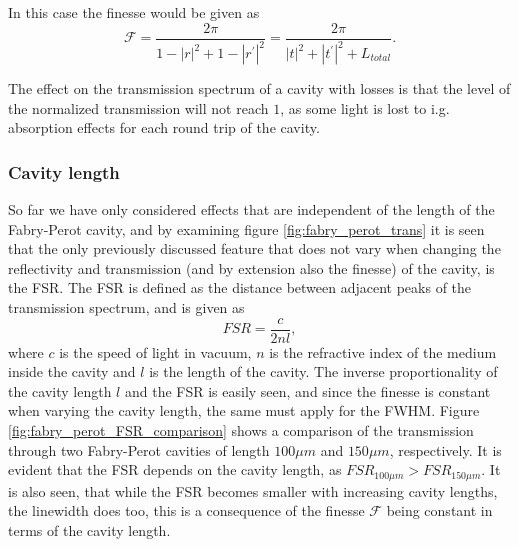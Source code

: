 In this case the finesse would be given as 
\begin{equation}
    \mathcal{F} = \frac{2 \pi}{1-|r|^2 + 1 - |r^{\prime}|^2} = \frac{2 \pi}{|t|^2 + |t^{\prime}|^2 + L_{total}}.
\end{equation}

The effect on the transmission spectrum of a cavity with losses is that the level of the normalized transmission will not reach $1$, as some light is lost to i.g. absorption effects for each round trip of the cavity.

\subsubsection{Cavity length}

So far we have only considered effects that are independent of the length of the Fabry-Perot cavity, and by examining figure \ref{fig:fabry_perot_trans} it is seen that the only previously discussed feature that does not vary when changing the reflectivity and transmission (and by extension also the finesse) of the cavity, is the FSR. The FSR is defined as the distance between adjacent peaks of the transmission spectrum, and is given as
\begin{equation}
    FSR = \frac{c}{2nl},
    \label{eq:FSR_formula}
\end{equation}
where $c$ is the speed of light in vacuum, $n$ is the refractive index of the medium inside the cavity and $l$ is the length of the cavity. The inverse proportionality of the cavity length $l$ and the FSR is easily seen, and since the finesse is constant when varying the cavity length, the same must apply for the FWHM. Figure \ref{fig:fabry_perot_FSR_comparison} shows a comparison of the transmission through two Fabry-Perot cavities of length $100\mu m$ and $150 \mu m$, respectively. It is evident that the FSR depends on the cavity length, as $FSR_{100 \mu m} > FSR_{150 \mu m}$. It is also seen, that while the FSR becomes smaller with increasing cavity lengths, the linewidth does too, this is a consequence of the finesse $\mathcal{F}$ being constant in terms of the cavity length. 

